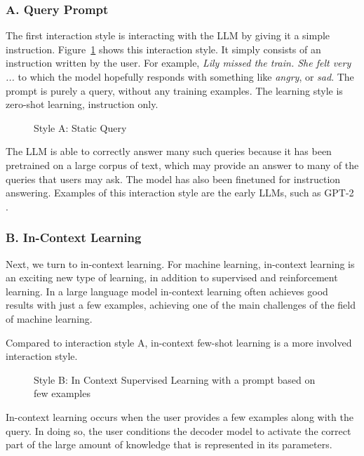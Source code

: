 \subsubsection{A. Query Prompt}
The first interaction style is interacting with the LLM by giving it a simple instruction. Figure~\ref{fig:rlA} shows this  interaction style. It simply
consists of an instruction written by the user. For example, {\em Lily
missed the train. She felt very ...} to which the model hopefully
responds with something like {\em angry}, or {\em sad}. The prompt is  purely a query, without
any training examples. The learning style is zero-shot learning,
instruction only.   
\begin{figure}
  \begin{center}
    
    \caption{Style A: Static Query}\label{fig:rlA}
  \end{center}
\end{figure}
The LLM is able to correctly answer many such queries because it has
been pretrained on a large corpus of text, which may provide an answer
to many of the queries that users may ask. The model  has also been finetuned for instruction answering. Examples of this
interaction style are the early LLMs, such as GPT-2 \citep{vaswani2017attention}.


\subsubsection{B. In-Context Learning}
Next, we turn to in-context learning. %
For machine learning,
in-context learning is an exciting new type of learning, in addition
to supervised and reinforcement learning. In a large language
model in-context learning often achieves good results with just a few examples,
achieving one of the main challenges of the field of machine learning.

Compared to interaction style A, in-context few-shot learning is a more involved interaction style. 
\begin{figure}
  \begin{center}
    
    \caption{Style B: In Context Supervised Learning with a prompt based on few examples}\label{fig:rlB}
  \end{center}
\end{figure}
In-context learning occurs when the user provides a few examples
along with the query. In doing so, the user conditions  the decoder model to activate the correct
part of the large amount of knowledge that is represented in its parameters. 

